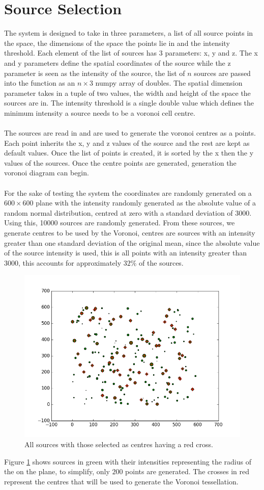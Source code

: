 \section{Source Selection}
The system is designed to take in three parameters, a list of all source points in the space, the dimensions of the space the points lie in and the intensity threshold. Each element of the list of sources has 3 parameters: x, y and z. The x and y parameters define the spatial coordinates of the source while the z parameter is seen as the intensity of the source, the list of $n$ sources are passed into the function as an $n \times 3$ numpy array of doubles. The spatial dimension parameter takes in a tuple of two values, the width and height of the space the sources are in. The intensity threshold is a single double value which defines the minimum intensity a source needs to be a voronoi cell centre.
\\
\\
The sources are read in and are used to generate the voronoi centres as a points. Each point inherits the x, y and z values of the source and the rest are kept as default values. Once the list of points is created, it is sorted by the x then the y values of the sources. Once the centre points are generated, generation the voronoi diagram can begin.
\\
\\
For the sake of testing the system the coordinates are randomly generated on a $600 \times 600$ plane with the intensity randomly generated as the absolute value of a random normal distribution, centred at zero with a standard deviation of $3000$. Using this, 10000 sources are randomly generated. From these sources, we generate centres to be used by the Voronoi, centres are sources with an intensity greater than one standard deviation of the original mean, since the absolute value of the source intensity is used, this is all points with an intensity greater than 3000, this accounts for approximately $32\%$ of the sources.
\begin{figure}[H]
\includegraphics[width=\textwidth]{Images/sources.png}
\caption{ All sources with those selected as centres having a red cross.}
\label{fig:source}
\end{figure}
Figure \ref{fig:source} shows sources in green with their intensities representing the radius of the on the plane, to simplify, only $200$ points are generated. The crosses in red represent the centres that will be used to generate the Voronoi tessellation.